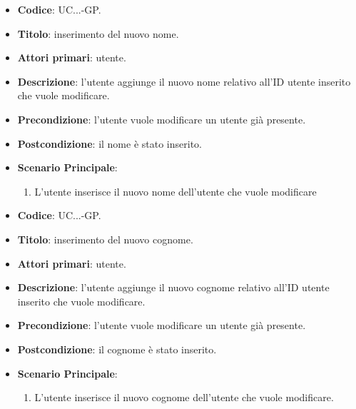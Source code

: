 				
				\begin{itemize}
					\item \textbf{Codice}: UC\theuccount.\thesubuccount.\thesubsubuccount.\thesubsubsubuccount-GP.
					\item \textbf{Titolo}: inserimento del nuovo nome.
					\item \textbf{Attori primari}: utente.
					\item \textbf{Descrizione}: l'utente aggiunge il nuovo nome relativo all'ID utente inserito che vuole modificare.
					\item \textbf{Precondizione}: l'utente vuole modificare un utente già presente.
					\item \textbf{Postcondizione}: il nome è stato inserito.
					\item \textbf{Scenario Principale}:
					\begin{enumerate}
						\item L'utente inserisce il nuovo nome dell'utente che vuole modificare
					\end{enumerate}
				\end{itemize}
			
				
				\begin{itemize}
					\item \textbf{Codice}: UC\theuccount.\thesubuccount.\thesubsubuccount.\thesubsubsubuccount-GP.
					\item \textbf{Titolo}: inserimento del nuovo cognome.
					\item \textbf{Attori primari}: utente.
					\item \textbf{Descrizione}: l'utente aggiunge il nuovo cognome relativo all'ID utente inserito che vuole modificare.
					\item \textbf{Precondizione}: l'utente vuole modificare un utente già presente.
					\item \textbf{Postcondizione}: il cognome è stato inserito.
					\item \textbf{Scenario Principale}:
					\begin{enumerate}
						\item L'utente inserisce il nuovo cognome dell'utente che vuole modificare.
					\end{enumerate}
				\end{itemize}
			

